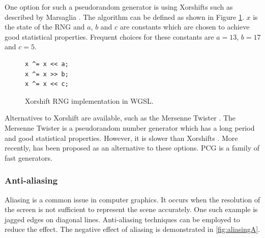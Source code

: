 One option for such a pseudorandom generator is using Xorshifts such as described by Marsaglia \cite{marsaglia2003xorshift}. The algorithm can be defined as shown in Figure \ref{code:xorShift}. $x$ is the state of the \gls{RNG} and $a$, $b$ and $c$ are constants which are chosen to achieve good statistical properties. Frequent choices for these constants are $a = 13$, $b = 17$ and $c = 5$.

\begin{figure}[H]
\begin{lstlisting}[style=wgsl]
x ^= x << a;
x ^= x >> b;
x ^= x << c;
\end{lstlisting}
\caption{Xorshift \gls{RNG} implementation in WGSL.}
\label{code:xorShift}
\end{figure}

Alternatives to Xorshift are available, such as the Mersenne Twister \cite{rngMersenneTwister}. The Mersenne Twister is a pseudorandom number generator which has a long period and good statistical properties. However, it is slower than Xorshifts \cite{o2014pcg}. More recently,  has been proposed as an alternative to these options. \gls{PCG} is a family of fast generators.

\subsubsection{Anti-aliasing}
\label{sec:anti-aliasing}

Aliasing is a common issue in computer graphics. It occurs when the resolution of the screen is not sufficient to represent the scene accurately. One such example is jagged edges on diagonal lines. Anti-aliasing techniques can be employed to reduce the effect. The negative effect of aliasing is demonstrated in \autoref{fig:aliasingA}.

